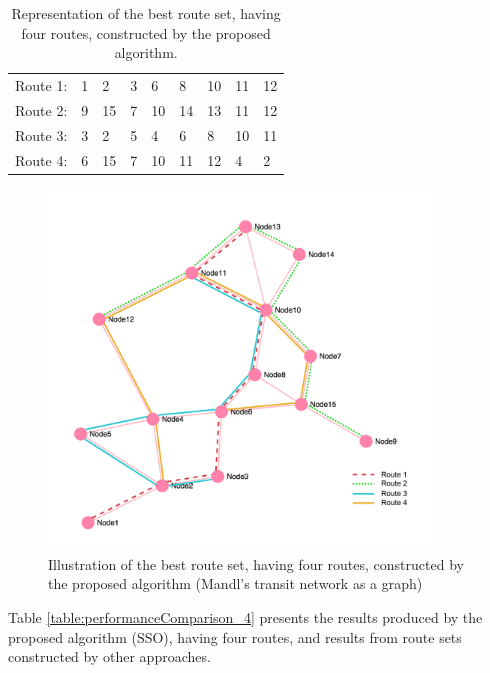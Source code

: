 
\begin{table}[H]
    \centering
    \begin{tabular}{|l|llllllll|}
    \hline
    Route 1: & 1 & 2 & 3 & 6 & 8 & 10 & 11 & 12 \\
    Route 2: & 9 & 15 & 7 & 10 & 14 & 13 & 11 & 12 \\
    Route 3: & 3 & 2 & 5 & 4 & 6 & 8 & 10 & 11 \\
    Route 4: & 6 & 15 & 7 & 10 & 11 & 12 & 4 & 2 \\
	\hline
    \end{tabular}
    \caption {Representation of the best route set, having four routes, constructed by the proposed algorithm.}
    \label{table:performanceComparison_bestRouteSet4}
\end{table}

\begin{figure}[H]
    \begin{center}
    \includegraphics[width=4in]{assets/mandlnetwork_4routes.png}
    \end{center}
    \caption{Illustration of the best route set, having four routes, constructed by the proposed algorithm (Mandl's transit network as a graph)}
    \label{fig:bestRouteSet4} 
\end{figure}

Table \vref{table:performanceComparison_4} presents the results produced by the proposed algorithm (SSO), having four routes, and results from route sets constructed by other approaches.

